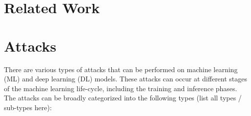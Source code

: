 \documentclass[conference]{IEEEtran}
\begin{document}





\section{Related Work}




\section{Attacks}

There are various types of attacks that can be performed on machine learning (ML) and deep learning (DL) models. These attacks can occur at different stages of the machine learning life-cycle, including the training and inference phases. The attacks can be broadly categorized into the following types (list all types / sub-types here):
\end{document}
